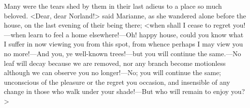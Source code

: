 Many were the tears shed by them in their last adieus to a place so much beloved. <Dear, dear Norland!> said Marianne, as she wandered alone before the house, on the last evening of their being there; <when shall I cease to regret you!—when learn to feel a home elsewhere!—Oh! happy house, could you know what I suffer in now viewing you from this spot, from whence perhaps I may view you no more!—And you, ye well-known trees!—but you will continue the same.—No leaf will decay because we are removed, nor any branch become motionless although we can observe you no longer!—No; you will continue the same; unconscious of the pleasure or the regret you occasion, and insensible of any change in those who walk under your shade!—But who will remain to enjoy you?>